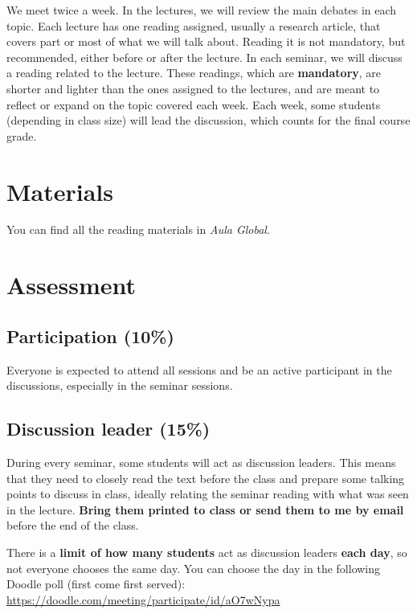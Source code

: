 \documentclass[12pt, a4paper]{article}
\begin{document}
We meet twice a week. In the lectures, we will review the main debates in each topic. Each lecture has one reading assigned, usually a research article, that covers part or most of what we will talk about. Reading it is not mandatory, but recommended, either before or after the lecture. In each seminar, we will discuss a reading related to the lecture. These readings, which are \textbf{mandatory}, are shorter and lighter than the ones assigned to the lectures, and are meant to reflect or expand on the topic covered each week. Each week, some students (depending in class size) will lead the discussion, which counts for the final course grade.

\section{Materials}

You can find all the reading materials in \textit{Aula Global}.

\newpage
\section{Assessment}


\subsection*{Participation (10\%)}

Everyone is expected to attend all sessions and be an active participant in the discussions, especially in the seminar sessions.

\subsection*{Discussion leader (15\%)}

During every seminar, some students will act as discussion leaders. This means that they need to closely read the text before the class and prepare some talking points to discuss in class, ideally relating the seminar reading with what was seen in the lecture. \textbf{Bring them printed to class or send them to me by email} before the end of the class.

There is a \textbf{limit of how many students} act as discussion leaders \textbf{each day}, so not everyone chooses the same day. You can choose the day in the following Doodle poll (first come first served): \href{https://doodle.com/meeting/participate/id/aO7wNypa}{https://doodle.com/meeting/participate/id/aO7wNypa}
\end{document}
